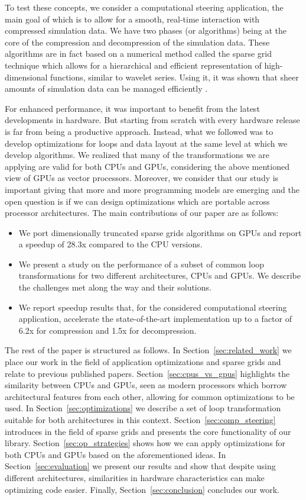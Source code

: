 To test these concepts, we consider a computational steering application, the
main goal of which is to allow for a smooth, real-time interaction with
compressed simulation data. We have two phases (or algorithms) being at the core
of the compression and decompression of the simulation data. These algorithms
are in fact based on a numerical method called the sparse grid technique which
allows for a hierarchical and efficient representation of high-dimensional
functions, similar to wavelet series. Using it, it was shown that sheer amounts
of simulation data can be managed efficiently \cite{Butnaru201156}.

For enhanced performance, it was important to benefit from the latest
developments in hardware. But starting from scratch with every hardware release
is far from being a productive approach. Instead, what we followed was to
develop optimizations for loops and data layout at the same level at which we
develop algorithms. We realized that many of the transformations we are applying
are valid for both CPUs and GPUs, considering the above mentioned view of GPUs
as vector processors. Moreover, we consider that our study is important giving
that more and more programming models are emerging and the open question is if
we can design optimizations which are portable across processor architectures.
The main contributions of our paper are as follows:

\begin{itemize}
  \item We port dimensionally truncated sparse grids algorithms on GPUs and
  report a speedup of 28.3x compared to the CPU versions.
  \item We present a study on the performance of a subset of common loop
  transformations for two different architectures, CPUs and GPUs. We describe
  the challenges met along the way and their solutions.
  \item We report speedup results that, for the considered computational
  steering application, accelerate the state-of-the-art implementation up to a
  factor of 6.2x for compression and 1.5x for decompression.
\end{itemize}

The rest of the paper is structured as follows. In
Section~\ref{sec:related_work} we place our work in the field of application
optimizations and sparse grids and relate to previous published papers.
Section~\ref{sec:cpus_vs_gpus} highlights the similarity between CPUs and GPUs,
seen as modern processors which borrow architectural features from each other,
allowing for common optimizations to be used.
In Section~\ref{sec:optimizations} we describe a set of loop transformation
suitable for both architectures in this context. Section~\ref{sec:comp_steering}
introduces in the field of sparse grids and presents the core functionality of
our library. Section~\ref{sec:op_strategies} shows how we can apply
optimizations for both CPUs and GPUs based on the aforementioned ideas. In
Section~\ref{sec:evaluation} we present our results and show that despite using
different architectures, similarities in hardware characteristics can make
optimizing code easier. Finally, Section~\ref{sec:conclusion} concludes our
work.
